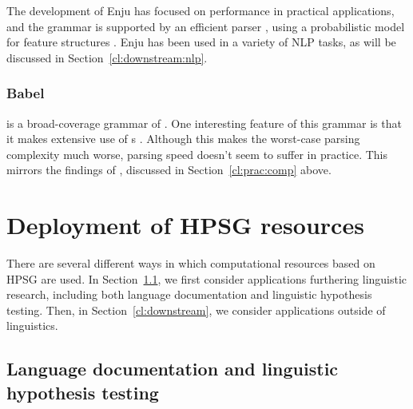 \documentclass[output=paper,biblatex,babelshorthands,newtxmath,draftmode,colorlinks,citecolor=brown]{langscibook}
\begin{document}
The development of Enju has focused on performance in practical applications,
and the grammar is supported by an efficient parser \citep{tsuruoka2004enju,matsuzaki2007supertag},
using a probabilistic model for feature structures \citep{MT2008a-u}.
Enju has been used in a variety of NLP tasks, as will be discussed in Section~\ref{cl:downstream:nlp}.

\subsubsection{Babel}
\label{cl:other:babel}

 is a broad-coverage grammar of  \citep{Babel,Mueller99a}.
One interesting feature of this grammar is that
it makes extensive use of s \citep{Mueller2004b}.
Although this makes the worst-case parsing complexity much worse,
parsing speed doesn't seem to suffer in practice.
This mirrors the findings of \citet{Carroll94},
discussed in Section~\ref{cl:prac:comp} above.






\section{Deployment of HPSG resources}
\label{cl:deployment}

There are several different ways in which computational resources based on HPSG are used.  In
Section~\ref{cl:lang-doc}, we first consider applications furthering linguistic research, including
both language documentation and linguistic hypothesis testing.  Then, in
Section~\ref{cl:downstream}, we consider applications outside of linguistics.


\subsection{Language documentation and linguistic hypothesis testing}
\label{cl:lang-doc}
\end{document}

